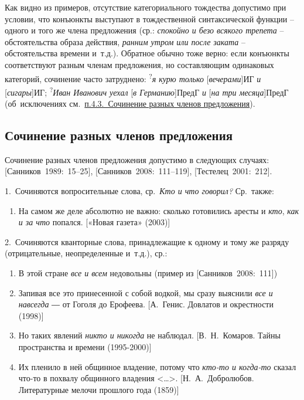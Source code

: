 Как видно из примеров, отсутствие категориального тождества допустимо
при условии, что конъюнкты выступают в тождественной синтаксической
функции -- одного и того же члена предложения (ср.: \emph{спокойно и
безо всякого трепета} -- обстоятельства образа действия, \emph{ранним
утром или после заката} -- обстоятельства времени и~т.д.). Обратное
обычно тоже верно: если конъюнкты соответствуют разным членам
предложения, но составляющим одинаковых категорий, сочинение часто
затруднено: \textsuperscript{?}\emph{я курю только}
{[}\emph{вечерами}{]}ИГ \emph{и} {[}\emph{сигары}{]}ИГ;
\textsuperscript{?}\emph{Иван Иванович уехал} {[}\emph{в
Германию}{]}ПредГ \emph{и} {[}\emph{на три месяца}{]}ПредГ
(об~исключениях см.~\underline{п.4.3.~Сочинение разных членов
предложения}).

\hypertarget{ux441ux43eux447ux438ux43dux435ux43dux438ux435-ux440ux430ux437ux43dux44bux445-ux447ux43bux435ux43dux43eux432-ux43fux440ux435ux434ux43bux43eux436ux435ux43dux438ux44f}{%
\subsection{Сочинение разных членов
предложения}\label{ux441ux43eux447ux438ux43dux435ux43dux438ux435-ux440ux430ux437ux43dux44bux445-ux447ux43bux435ux43dux43eux432-ux43fux440ux435ux434ux43bux43eux436ux435ux43dux438ux44f}}

Сочинение разных членов предложения допустимо в следующих случаях:
{[}Санников~1989:~15--25{]}, {[}Санников~2008:~111--119{]},
{[}Тестелец~2001:~212{]}.

1.~Сочиняются вопросительные слова, ср.~\emph{Кто и что говорил?}
Ср.~также:

\begin{enumerate}
\def\labelenumi{(\arabic{enumi})}
\setcounter{enumi}{32}
\item
  На самом же деле абсолютно не важно: сколько готовились аресты и
  \emph{кто}, \emph{как и за что} попался. {[}«Новая газета» (2003){]}
\end{enumerate}

2.~Сочиняются кванторные слова, принадлежащие к одному и тому же разряду
(отрицательные, неопределенные и~т.д.), ср.:

\begin{enumerate}
\def\labelenumi{(\arabic{enumi})}
\setcounter{enumi}{33}
\item
  В этой стране \emph{все и всем} недовольны (пример из
  {[}Санников~2008:~111{]})
\item
  Запивая все это принесенной с собой водкой, мы сразу выяснили
  \emph{все и навсегда} ― от Гоголя до Ерофеева. {[}А.~Генис. Довлатов и
  окрестности (1998){]}
\item
  Но таких явлений \emph{никто и никогда} не наблюдал. {[}В.~Н.~Комаров.
  Тайны пространства и времени (1995-2000){]}
\item
  Их пленило в ней общинное владение, потому что \emph{кто-то и
  когда-то} сказал что-то в похвалу общинного владения
  \textless\ldots\textgreater. {[}Н.~А.~Добролюбов. Литературные мелочи
  прошлого года (1859){]}
\end{enumerate}

